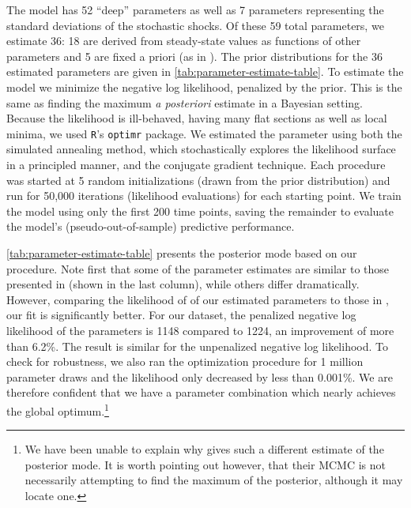 \documentclass[11pt]{article}
\begin{document}
The model has 52 ``deep'' parameters as well as 7 parameters
representing the standard deviations of the stochastic shocks. Of these
59 total parameters, we estimate 36: 18 are derived from steady-state
values as functions of other parameters and 5 are fixed a priori (as in
\citealt{SmetsWouters2007}). The prior distributions for the 36
estimated parameters are given in
\autoref{tab:parameter-estimate-table}. To estimate the model we
minimize the negative log likelihood, penalized by the prior. This is
the same as finding the maximum \emph{a posteriori} estimate in a
Bayesian setting. Because the likelihood is ill-behaved, having many
flat sections as well as local minima, we used \texttt{R}'s
\texttt{optimr} package. We estimated the parameter using both the
simulated annealing method, which stochastically explores the likelihood
surface in a principled manner, and the conjugate gradient technique.
Each procedure was started at 5 random initializations (drawn from the
prior distribution) and run for 50,000 iterations (likelihood
evaluations) for each starting point. We train the model using only the
first 200 time points, saving the remainder to evaluate the model's
(pseudo-out-of-sample) predictive performance.

\autoref{tab:parameter-estimate-table} presents the posterior mode based
on our procedure. Note first that some of the parameter estimates are
similar to those presented in \citet{SmetsWouters2007} (shown in the
last column), while others differ dramatically. However, comparing the
likelihood of of our estimated parameters to those in
\citet{SmetsWouters2007}, our fit is significantly better. For our
dataset, the penalized negative log likelihood of the parameters is 1148
compared to 1224, an improvement of more than 6.2\%. The result is
similar for the unpenalized negative log likelihood. To check for
robustness, we also ran the optimization procedure for 1 million
parameter draws and the likelihood only decreased by less than 0.001\%.
We are therefore confident that we have a parameter combination which
nearly achieves the global optimum.\footnote{We have been unable to
  explain why \citet{SmetsWouters2007} gives such a different estimate
  of the posterior mode. It is worth pointing out however, that their
  MCMC is not necessarily attempting to find the maximum of the
  posterior, although it may locate one.}
\end{document}
